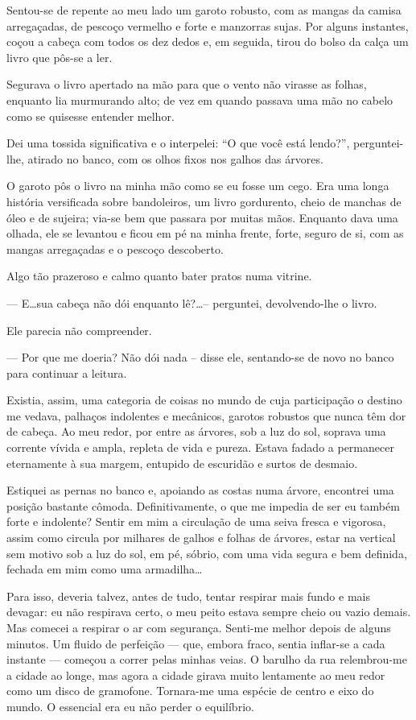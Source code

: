 Sentou-se de repente ao meu lado um garoto robusto, com as mangas da camisa arregaçadas, de pescoço vermelho e forte e manzorras sujas. Por alguns instantes, coçou a cabeça com todos os dez dedos e, em seguida, tirou do bolso da calça um livro que pôs-se a ler.

Segurava o livro apertado na mão para que o vento não virasse as folhas, enquanto lia murmurando alto; de vez em quando passava uma mão no cabelo como se quisesse entender melhor.

Dei uma tossida significativa e o interpelei: ``O que você está lendo?'', perguntei-lhe, atirado no banco, com os olhos fixos nos galhos das árvores.

O garoto pôs o livro na minha mão como se eu fosse um cego. Era uma longa história versificada sobre bandoleiros, um livro gordurento, cheio de manchas de óleo e de sujeira; via-se bem que passara por muitas mãos. Enquanto dava uma olhada, ele se levantou e ficou em pé na minha frente, forte, seguro de si, com as mangas arregaçadas e o pescoço descoberto.

Algo tão prazeroso e calmo quanto bater pratos numa vitrine.

--- E\dots sua cabeça não dói enquanto lê?\dots -- perguntei, devolvendo-lhe o livro.

Ele parecia não compreender.

--- Por que me doeria? Não dói nada -- disse ele, sentando-se de novo no banco para continuar a leitura.

Existia, assim, uma categoria de coisas no mundo de cuja participação o destino me vedava, palhaços indolentes e mecânicos, garotos robustos que nunca têm dor de cabeça. Ao meu redor, por entre as árvores, sob a luz do sol, soprava uma corrente vívida e ampla, repleta de vida e pureza. Estava fadado a permanecer eternamente à sua margem, entupido de escuridão e surtos de desmaio.

Estiquei as pernas no banco e, apoiando as costas numa árvore, encontrei uma posição bastante cômoda. Definitivamente, o que me impedia de ser eu também forte e indolente? Sentir em mim a circulação de uma seiva fresca e vigorosa, assim como circula por milhares de galhos e folhas de árvores, estar na vertical sem motivo sob a luz do sol, em pé, sóbrio, com uma vida segura e bem definida, fechada em mim como uma armadilha\dots

Para isso, deveria talvez, antes de tudo, tentar respirar mais fundo e mais devagar: eu não respirava certo, o meu peito estava sempre cheio ou vazio demais. Mas comecei a respirar o ar com segurança. Senti-me melhor depois de alguns minutos. Um fluido de perfeição --- que, embora fraco, sentia inflar-se a cada instante --- começou a correr pelas minhas veias. O barulho da rua relembrou-me a cidade ao longe, mas agora a cidade girava muito lentamente ao meu redor como um disco de gramofone. Tornara-me uma espécie de centro e eixo do mundo. O essencial era eu não perder o equilíbrio.

